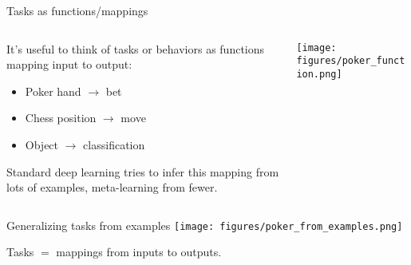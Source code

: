 \documentclass{beamer}
\begin{document}
\begin{frame}{Tasks as functions/mappings}
\begin{columns}
\begin{column}{0.5\textwidth}
It's useful to think of tasks or behaviors as functions mapping input to output:
\begin{itemize}
    \item Poker hand \(\rightarrow\) bet
    \item Chess position \(\rightarrow\) move
    \item Object \(\rightarrow\) classification
\end{itemize}
Standard deep learning tries to infer this mapping from lots of examples, meta-learning from fewer. 
\end{column}

\begin{column}{0.5\textwidth}
\texttt{[image: figures/poker\_function.png]}
\end{column}
\end{columns}
\end{frame}

\begin{frame}{Generalizing tasks from examples}
\centering
\texttt{[image: figures/poker\_from\_examples.png]}
\end{frame}

\begin{frame}[standout]
Tasks \(\bm =\) mappings from inputs to outputs.\\[1em] 
\end{frame}

%
%
\end{document}
